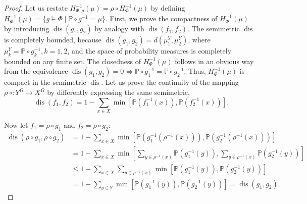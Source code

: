 \begin{proof}
	Let us restate $H_{\Phi,\rho}^{-1}(\mu) = \rho \circ H_{\Phi}^{-1}(\mu)$ by defining $H_{\Phi}^{-1}(\mu) = \{g \models \Phi \mid \mathbb{P} \circ g^{-1} = \mu\}$. First, we prove the compactness of $H_{\Phi}^{-1}(\mu)$ by introducing $\operatorname{dis}(g_1, g_2)$ by analogy with $\operatorname{dis}(f_1, f_2)$. The semimetric $\operatorname{dis}$ is completely bounded, because $\operatorname{dis}(g_1, g_2) = d(\mu^Y_1, \mu^Y_2)$, where $\mu^Y_k = \mathbb{P} \circ g_k^{-1}, k=1,2$, and the space of probability measures is completely bounded on any finite set. The closedness of $H_{\Phi}^{-1}(\mu)$ follows in an obvious way from the equivalence $\operatorname{dis}(g_1, g_2) = 0 \Leftrightarrow \mathbb{P} \circ g_1^{-1} = \mathbb{P} \circ g_2^{-1}$. Thus, $H_{\Phi}^{-1}(\mu)$ is compact in the semimetric $\operatorname{dis}$. Let us prove the continuity of the mapping $\rho\ \circ : Y^\Omega \rightarrow X^\Omega$ by differently expressing the same semimetric, %
	\begin{equation*}
		\operatorname{dis}(f_1, f_2) = 1 - \sum_{x \in X} \min \left[\mathbb{P}(f_1^{-1}(x)), \mathbb{P}(f_2^{-1}(x))\right].
	\end{equation*}
	
	Now let $f_1 = \rho \circ g_1$ and $f_2 = \rho \circ g_2$:
	\begin{align*}
		\operatorname{dis}(\rho \circ g_1, \rho \circ g_2) &= 1 - \sum_{x \in X} \min \left[\mathbb{P}(g_1^{-1}(\rho^{-1}(x))), \mathbb{P}(g_2^{-1}(\rho^{-1}(x)))\right] \\
		&= 1 - \sum_{x \in X} \min \left[\sum_{y \in \rho^{-1}(x)} \mathbb{P}(g_1^{-1}(y)), \sum_{y \in \rho^{-1}(x)} \mathbb{P}(g_2^{-1}(y))\right] \\
		&\le 1 - \sum_{x \in X} \sum_{y \in \rho^{-1}(x)} \min \left[\mathbb{P}(g_1^{-1}(y)), \mathbb{P}(g_2^{-1}(y))\right] \\
		&= 1 - \sum_{y \in Y} \min \left[\mathbb{P}(g_1^{-1}(y)), \mathbb{P}(g_2^{-1}(y))\right] = \operatorname{dis}(g_1, g_2).
	\end{align*}
	

\end{proof}

